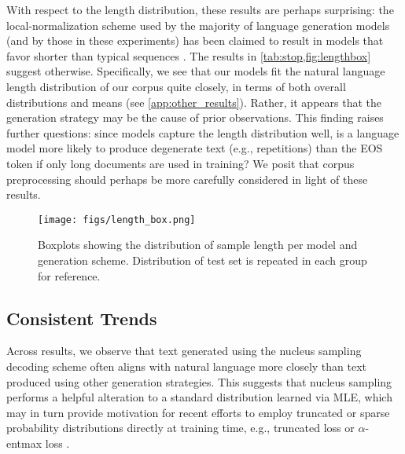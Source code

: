 \documentclass[11pt,a4paper]{article}
\begin{document}
With respect to the length distribution, these results are perhaps surprising: the local-normalization scheme used by the majority of language generation models (and by those in these experiments) has been claimed to result in models that favor shorter than typical sequences \cite{sountsov-sarawagi-2016-length,murray-chiang-2018-correcting}. The results in \cref{tab:stop,fig:lengthbox} suggest otherwise. Specifically, we see that our models fit the natural language length distribution of our corpus quite closely, in terms of both overall distributions and means (see \cref{app:other_results}). Rather, it appears that the generation strategy may be the cause of prior observations. 
This finding  raises further questions: since models capture the length distribution well, is a language model more likely to produce degenerate text (e.g., repetitions) than the EOS token if only long documents are used in training? We posit that corpus preprocessing should perhaps be more carefully considered in light of these results. 
\begin{figure}
\centering
    \texttt{[image: figs/length\_box.png]}
  \caption{Boxplots showing the distribution of sample length per model and generation scheme. Distribution of test set is repeated in each group for reference.}
  \vspace{-1em}
    \label{fig:lengthbox}
\end{figure}

\subsection{Consistent Trends}
Across results, we observe that text generated using the nucleus sampling decoding scheme often aligns with natural language more closely than text produced using other generation strategies. This suggests that nucleus sampling performs a helpful alteration to a standard distribution learned via MLE, which may in turn provide motivation for recent efforts to employ truncated or sparse probability distributions directly at training time, e.g., truncated loss \cite{kang-hashimoto-2020-improved} or $\alpha$-entmax loss \cite{peters-etal-2019-sparse}.
\end{document}

